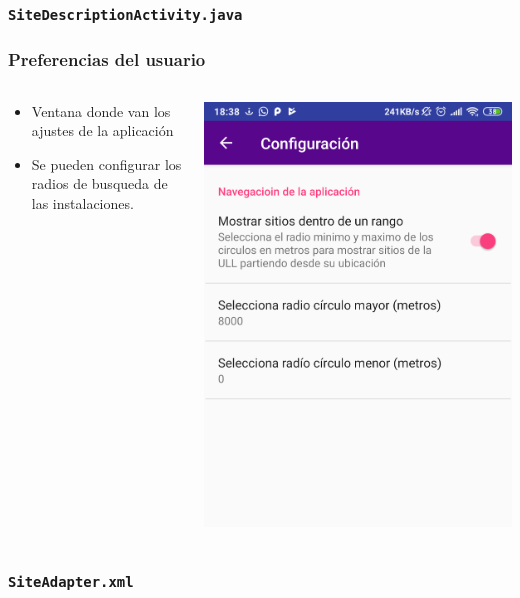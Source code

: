 \begin{frame}
	\frametitle{\texttt{SiteDescriptionActivity.java}}
	
\end{frame}  


\begin{frame}
	\frametitle{Preferencias del usuario}
	\begin{columns}
		\begin{column}{0.6\textwidth}
			\begin{itemize}
				\item Ventana donde van los ajustes de la aplicación
				\item Se pueden configurar los radios de busqueda de las instalaciones.
			\end{itemize}
			\endblock{}
		\end{column}
		\begin{column}{0.4\textwidth} 
			\vfill 
			\begin{center}
				\includegraphics[width=0.9\linewidth]{Images/settingsApp}
			\end{center}
		\end{column}
	\end{columns}
\end{frame} 

\begin{frame}
	\frametitle{\texttt{SiteAdapter.xml}}
	
\end{frame}  
